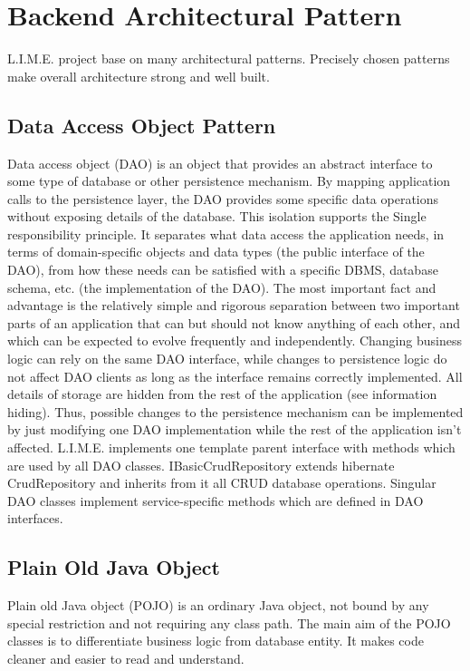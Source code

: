 \documentclass[a4paper,11pt,twoside]{report}
\theoremstyle{definition}
\begin{document}
\section{Backend Architectural Pattern}

L.I.M.E. project base on many architectural patterns. Precisely chosen patterns make overall architecture strong and well built. 
\subsection{Data Access Object Pattern}

Data access object (DAO) is an object that provides an abstract interface to some type of database or other persistence mechanism. By mapping application calls to the persistence layer, the DAO provides some specific data operations without exposing details of the database. This isolation supports the Single responsibility principle. It separates what data access the application needs, in terms of domain-specific objects and data types (the public interface of the DAO), from how these needs can be satisfied with a specific DBMS, database schema, etc. (the implementation of the DAO).
	The most important fact and advantage is the relatively simple and rigorous separation between two important parts of an application that can but should not know anything of each other, and which can be expected to evolve frequently and independently. Changing business logic can rely on the same DAO interface, while changes to persistence logic do not affect DAO clients as long as the interface remains correctly implemented. All details of storage are hidden from the rest of the application (see information hiding). Thus, possible changes to the persistence mechanism can be implemented by just modifying one DAO implementation while the rest of the application isn't affected.
L.I.M.E. implements one template parent interface with methods which are used by all DAO classes. IBasicCrudRepository extends hibernate CrudRepository and inherits from it all CRUD database operations. Singular DAO classes implement service-specific methods which are defined in DAO interfaces.

\subsection{Plain Old Java Object}

Plain old Java object (POJO) is an ordinary Java object, not bound by any special restriction and not requiring any class path. 
The main aim of the POJO classes is to differentiate business logic from database entity. It makes code cleaner and easier to read and understand.
\end{document}
